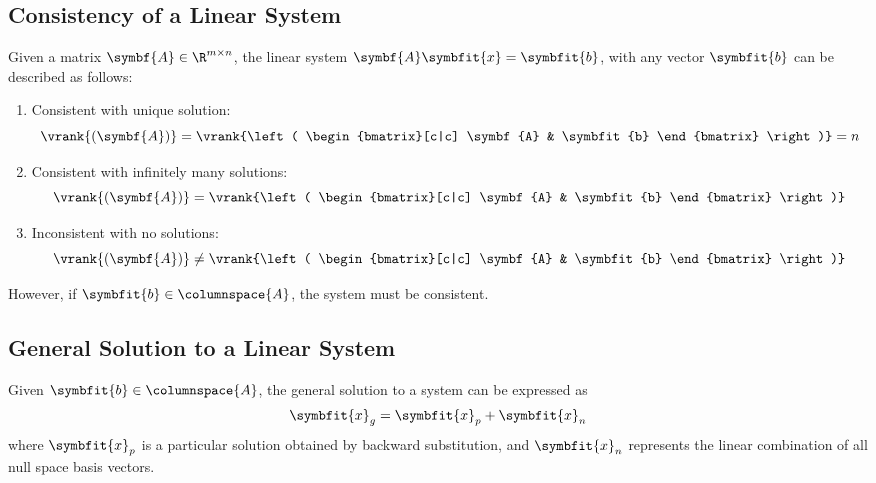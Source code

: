 \documentclass{article}
\begin{document}
\subsection{Consistency of a Linear System}
Given a matrix \(\symbf{A} \in \R^{m \times n}\), the linear system \(\symbf{A}\symbfit{x} = \symbfit{b}\),
with any vector \(\symbfit{b}\) can be described as follows:
\begin{enumerate}
    \item Consistent with unique solution:
          \begin{equation*}
              \vrank{\left( \symbf{A} \right)} =
              \vrank{\left( \begin{bmatrix}[c|c]
                      \symbf{A} & \symbfit{b}
                  \end{bmatrix} \right)} = n
          \end{equation*}
    \item Consistent with infinitely many solutions:
          \begin{equation*}
              \vrank{\left( \symbf{A} \right)} =
              \vrank{\left( \begin{bmatrix}[c|c]
                      \symbf{A} & \symbfit{b}
                  \end{bmatrix} \right)}
          \end{equation*}
    \item Inconsistent with no solutions:
          \begin{equation*}
              \vrank{\left( \symbf{A} \right)} \neq
              \vrank{\left( \begin{bmatrix}[c|c]
                      \symbf{A} & \symbfit{b}
                  \end{bmatrix} \right)}
          \end{equation*}
\end{enumerate}
However, if \(\symbfit{b} \in \columnspace{{A}}\), the system must be consistent.
\subsection{General Solution to a Linear System}
Given \(\symbfit{b} \in \columnspace{A}\), the general solution to a system can be expressed as
\begin{equation*}
    \symbfit{x}_g = \symbfit{x}_p + \symbfit{x}_n
\end{equation*}
where \(\symbfit{x}_p\) is a particular solution obtained by backward substitution, and
\(\symbfit{x}_n\) represents the linear combination of all null space basis vectors.
\end{document}
